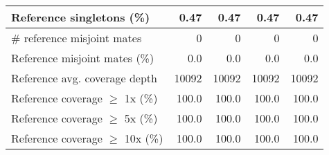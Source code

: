 \documentclass[12pt,a4paper]{article}
\begin{document}
\begin{table}[ht]
\begin{center}
\begin{tabular}{|l*{4}{|r}|}
Reference singletons (\%) & 0.47 & 0.47 & 0.47 & 0.47 \\ \hline
\# reference misjoint mates & 0 & 0 & 0 & 0 \\ \hline
Reference misjoint mates (\%) & 0.0 & 0.0 & 0.0 & 0.0 \\ \hline
Reference avg. coverage depth & 10092 & 10092 & 10092 & 10092 \\ \hline
Reference coverage $\geq$ 1x (\%) & 100.0 & 100.0 & 100.0 & 100.0 \\ \hline
Reference coverage $\geq$ 5x (\%) & 100.0 & 100.0 & 100.0 & 100.0 \\ \hline
Reference coverage $\geq$ 10x (\%) & 100.0 & 100.0 & 100.0 & 100.0 \\ \hline
\end{tabular}
\end{center}
\end{table}
\end{document}
